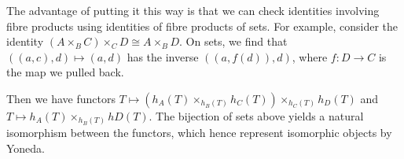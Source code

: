 The advantage of putting it this way is that we can check identities involving
fibre products using identities of fibre products of sets. For example, consider
the identity $(A\times_B C)\times_C D\cong A\times_B D$. On sets, we find
that $((a, c), d)\mapsto (a, d)$ has the inverse $((a, f(d)), d)$, where
$f\colon D\to C$ is the map we pulled back.

Then we have functors $T\mapsto (h_A(T)\times_{h_B(T)} h_C(T))\times_{h_C(T)} h_D(T)$
and $T\mapsto h_A(T)\times_{h_B(T)} hD(T)$. The bijection of sets above
yields a natural isomorphism between the functors, which hence represent
isomorphic objects by Yoneda.
